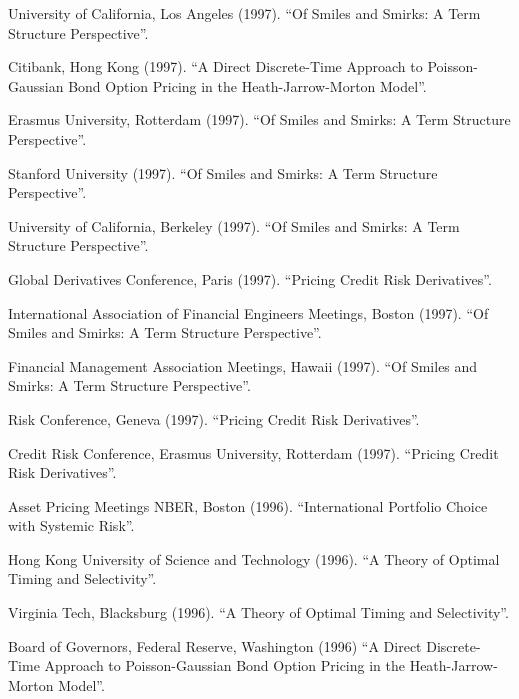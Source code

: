 \documentclass{article}
\begin{document}
\begin{etaremune}
{\item University of California, Los Angeles (1997).
``Of Smiles and Smirks: A Term Structure Perspective''. 

\item Citibank, Hong Kong (1997). 
``A Direct Discrete-Time Approach to
Poisson-Gaussian Bond Option Pricing in the Heath-Jarrow-Morton 
Model''. 

\item Erasmus University, Rotterdam (1997). 
``Of Smiles and Smirks: A Term Structure Perspective''. 

\item Stanford University (1997).
``Of Smiles and Smirks: A Term Structure Perspective''. 

\item University of California, Berkeley (1997).
``Of Smiles and Smirks: A Term Structure Perspective''. 

\item Global Derivatives Conference, Paris (1997).
``Pricing Credit Risk Derivatives''.

\item International Association of Financial Engineers Meetings, Boston (1997).
``Of Smiles and Smirks: A Term Structure Perspective''. 

\item Financial Management Association Meetings, Hawaii (1997).
``Of Smiles and Smirks: A Term Structure Perspective''. 

\item Risk Conference, Geneva (1997).
``Pricing Credit Risk Derivatives''.

\item Credit Risk Conference, Erasmus University, Rotterdam (1997).
``Pricing Credit Risk Derivatives''.

\item Asset Pricing Meetings NBER, Boston (1996). 
``International Portfolio Choice with Systemic Risk''.
 
\item Hong Kong University of Science and Technology (1996).
``A Theory of Optimal Timing and Selectivity''.  

\item Virginia Tech, Blacksburg (1996).
``A Theory of Optimal Timing and Selectivity''.  

\item Board of Governors, Federal Reserve, Washington (1996)
``A Direct Discrete-Time Approach to
Poisson-Gaussian Bond Option Pricing in the Heath-Jarrow-Morton 
Model''. 

}
\end{etaremune}
\end{document}
